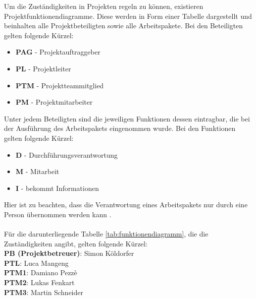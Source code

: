 Um die Zuständigkeiten in Projekten regeln zu können, existieren Projektfunktionendiagramme. Diese werden in Form einer Tabelle dargestellt und beinhalten alle Projektbeteiligten sowie alle Arbeitspakete. Bei den Beteiligten gelten folgende Kürzel:
\begin{itemize}
	\item \textbf{PAG} - Projektauftraggeber
	\item \textbf{PL} - Projektleiter
	\item \textbf{PTM} - Projektteammitglied
	\item \textbf{PM} - Projektmitarbeiter
\end{itemize}
Unter jedem Beteiligten sind die jeweiligen Funktionen dessen eintragbar, die bei der Ausführung des Arbeitspakets eingenommen wurde.
Bei den Funktionen gelten folgende Kürzel:
\begin{itemize}
	\item \textbf{D} - Durchführungsverantwortung
	\item \textbf{M} - Mitarbeit
	\item \textbf{I} - bekommt Informationen
\end{itemize}
Hier ist zu beachten, dass die Verantwortung eines Arbeitspakets nur durch eine Person übernommen werden kann \cite[vgl.][]{prezi:o.J.}. \\ \\
Für die darunterliegende Tabelle \ref{tab:funktionendiagramm}, die die Zuständigkeiten angibt, gelten folgende Kürzel: \\ 
\textbf{PB (Projektbetreuer)}: Simon Köldorfer \\\textbf{PTL}: Luca Mangeng \\\textbf{PTM1}: Damiano Pezzè\\\textbf{PTM2}: Lukas Fenkart\\\textbf{PTM3}: Martin Schneider

